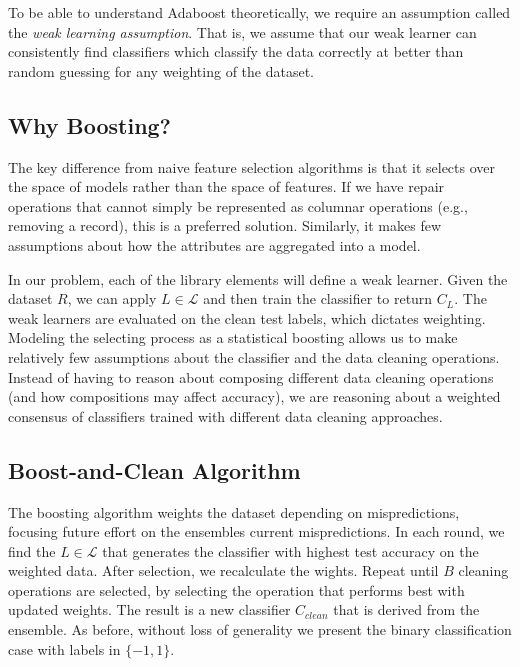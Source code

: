 To be able to understand Adaboost theoretically, we require an assumption called the \emph{weak learning assumption}. That is, we assume that our weak learner can consistently find classifiers which classify the data correctly at better than random guessing for any weighting of the dataset. 

\subsection{Why Boosting?}
The key difference from naive feature selection algorithms is that it selects over the space of models rather than the space of features.
If we have repair operations that cannot simply be represented as columnar operations (e.g., removing a record), this is a preferred solution.
Similarly, it makes few assumptions about how the attributes are aggregated into a model.

In our problem, each of the library elements will define a weak learner.
Given the dataset $R$, we can apply $L \in \mathcal{L}$ and then train the classifier to return $C_L$. 
The weak learners are evaluated on the clean test labels, which dictates weighting.
Modeling the selecting process as a statistical boosting allows us to make relatively few assumptions about the classifier and the data cleaning operations. 
Instead of having to reason about composing different data cleaning operations (and how compositions may affect accuracy), we are reasoning about a weighted consensus of classifiers trained with different data cleaning approaches.

\subsection{Boost-and-Clean Algorithm}\label{s:boostalg}
The boosting algorithm weights the dataset depending on mispredictions, focusing future effort on the ensembles current mispredictions.
In each round, we find the $L \in \mathcal{L}$ that generates the classifier with highest test accuracy on the weighted data.
After selection, we recalculate the wights.
Repeat until $B$ cleaning operations are selected, by selecting the operation that performs best with updated weights.
The result is a new classifier $C_{clean}$ that is derived from the ensemble.
As before, without loss of generality we present the binary classification case with labels in $\{-1,1\}$.

